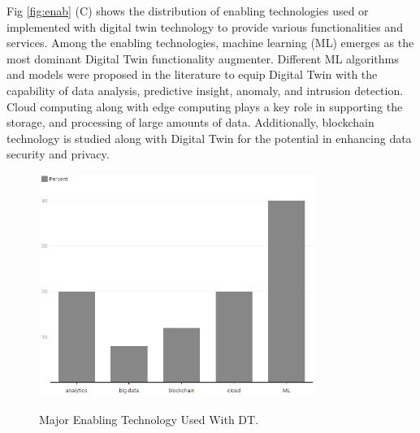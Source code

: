 Fig \ref{fig:enab} (C) shows the distribution of enabling technologies used or implemented with digital twin technology to provide various functionalities and services. Among the enabling technologies, machine learning (ML) emerges as the most dominant Digital Twin functionality augmenter. Different ML algorithms and models were proposed in the literature to equip Digital Twin with the capability of data analysis, predictive insight, anomaly, and intrusion detection. Cloud computing along with edge computing plays a key role in supporting the storage, and processing of large amounts of data. Additionally, blockchain technology is studied along with Digital Twin for the potential in enhancing data security and privacy.


\begin{figure}[H]    
    \caption{Major Enabling Technology Used With DT.}
    \centring
    \includegraphics[width=0.8\textwidth]{images/rt/enabling-distribution_2.png}
    \label{fig:enable}
\end{figure}

